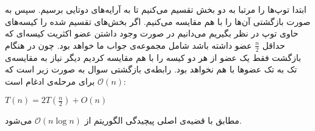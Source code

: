 ابتدا توپ‌ها را مرتبا به دو بخش تقسیم می‌کنیم تا به آرایه‌های دوتایی برسیم. سپس به صورت بازگشتی آن‌ها را با هم مقایسه می‌کنیم. اگر بخش‌های تقسیم شده را کیسه‌های حاوی توپ در نظر بگیریم می‌دانیم در صورت وجود داشتن عضو اکثریت کیسه‌ای که حداقل  $\frac{n}{2}$ عضو داشته باشد شامل مجموعه‌ی جواب ما خواهد بود. چون در هنگام بازگشت فقط یک عضو از هر دو کیسه را با هم مقایسه کردیم دیگر نیاز به مقایسه‌ی تک به تک عضوها با هم نخواهد بود.
رابطه‌ی بازگشتی سوال به صورت زیر است که $\mathcal{O}(n)$ برای مرحله‌ی ادغام است:
\begin{LTR}
$T(n) = 2T(\frac{n}{2}) + O(n)$ 
\end{LTR}

مطابق با قضیه‌ی اصلی پیچیدگی الگوریتم از $\mathcal{O}(n\log n)$
می‌شود.
